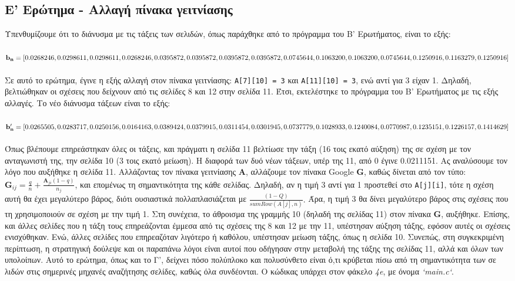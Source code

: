 \documentclass[a4paper, 14pt]{article}   %
\begin{document}
\subsection*{Ε' Ερώτημα - Αλλαγή πίνακα γειτνίασης}  %
Υπενθυμίζουμε ότι το διάνυσμα με τις τάξεις των σελιδών, όπως παράχθηκε από το πρόγραμμα του Β' Ερωτήματος, είναι το εξής:\\\\
$\mathbf{b_n} = [0.0268246, 0.0298611, 0.0298611, 0.0268246, 0.0395872, 0.0395872, 0.0395872,\\ 0.0395872, 0.0745644, 0.1063200, 0.1063200, 0.0745644, 0.1250916, 0.1163279,  0.1250916]$\\\\
Σε αυτό το ερώτημα, έγινε η εξής αλλαγή στον πίνακα γειτνίασης: \texttt{A[7][10] = 3} και \texttt{A[11][10] = 3}, ενώ αντί για 3 είχαν 1. Δηλαδή, βελτιώθηκαν οι σχέσεις που δείχνουν από τις σελίδες 8 και 12 στην σελίδα 11. Έτσι, εκτελέστηκε το πρόγραμμα του Β' Ερωτήματος με τις εξής αλλαγές. Το νέο διάνυσμα τάξεων είναι το εξής:\\\\
$\mathbf{b'_n} = [0.0265505, 0.0283717, 0.0250156, 0.0164163, 0.0389424, 0.0379915, 0.0311454,\\ 0.0301945, 0.0737779, 0.1028933, 0.1240084, 0.0770987, 0.1235151, 0.1226157, 0.1414629]$\\\\
Όπως βλέπουμε επηρεάστηκαν όλες οι τάξεις, και πράγματι η σελίδα 11 βελτίωσε την τάξη (16 τοις εκατό αύξηση) της σε σχέση με τον ανταγωνιστή της, την σελίδα 10 (3 τοις εκατό μείωση). Η διαφορά των δυό νέων τάξεων, υπέρ της 11, από 0 έγινε 0.0211151. Ας αναλύσουμε τον λόγο που αυξήθηκε η σελίδα 11. Αλλάζοντας τον πίνακα γειτνίασης $\mathbf{A}$, αλλάζουμε τον πίνακα Google $\mathbf{G}$, καθώς δίνεται από τον τύπο: $\mathbf{G}_{ij} = \frac{q}{n} + \frac{\mathbf{A}_{ji}(1-q)}{n_j}$, και επομένως τη σημαντικότητα της κάθε σελίδας. Δηλαδή, αν η τιμή 3 αντί για 1 προστεθεί στο \texttt{A[j][i]}, τότε η σχέση αυτή θα έχει μεγαλύτερο βάρος, διότι ουσιαστικά πολλαπλασιάζεται με $\frac{(1-Q)}{sumRow(A[j], n)}.$ Άρα, η τιμή 3 θα δίνει μεγαλύτερο βάρος στις σχέσεις που τη χρησιμοποιούν σε σχέση με την τιμή 1. Στη συνέχεια, το άθροισμα της γραμμής 10 (δηλαδή της σελίδας 11) στον πίνακα $\mathbf{G}$, αυξήθηκε. Επίσης, και άλλες σελίδες που η τάξη τους επηρεάζονται έμμεσα από τις σχέσεις της 8 και 12 με την 11, υπέστησαν αύξηση τάξης, εφόσον αυτές οι σχέσεις ενισχύθηκαν. Ενώ, άλλες σελίδες που επηρεαζόταν λιγότερο ή καθόλου, υπέστησαν μείωση τάξης, όπως η σελίδα 10. Συνεπώς, στη συγκεκριμένη περίπτωση, η στρατηγική δούλεψε και οι παραπάνω λόγοι είναι αυτοί που οδήγησαν στην μεταβολή της τάξης της σελίδας 11, αλλά και όλων των υπολοίπων. Αυτό το ερώτημα, όπως και το Γ', δείχνει πόσο πολύπλοκο και πολυσύνθετο είναι ό,τι κρύβεται πίσω από τη σημαντικότητα των σε λιδών στις σημερινές μηχανές αναζήτησης σελίδες, καθώς όλα συνδέονται. Ο κώδικας υπάρχει στον φάκελο \emph{4e}, με όνομα \emph{`main.c`}.
\end{document}
